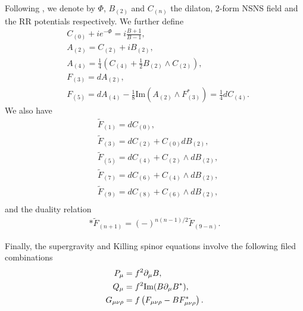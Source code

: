 Following \cite{Buchel:2000cn}, we denote by $\Phi$, $B_{(2)}$ and $C_{(n)}$ the dilaton, 2-form NSNS field and the RR potentials respectively.
We further define
\begin{align}\label{eq:defs1}
&C_{(0)} + i e^{-\Phi} = i\frac{B+1}{B-1},\nonumber\\
&A_{(2)} = C_{(2)} + i B_{(2)},\nonumber\\
&A_{(4)} = \frac{1}{4}\left(C_{(4)} + \frac{1}{2}B_{(2)}\wedge C_{(2)}\right),\nonumber\\
&F_{(3)} = d A_{(2)},\nonumber\\
&F_{(5)} = d A_{(4)} - \frac{1}{8} \text{Im} (A_{(2)}\wedge F_{(3)}^*) = \frac{1}{4} d C_{(4)}.
\end{align}
We also have
\begin{align}\label{eq:defs2}
&\tilde F_{(1)} = d C_{(0)},\nonumber\\
&\tilde F_{(3)} = d C_{(2)} + C_{(0)} d B_{(2)},\nonumber\\
&\tilde F_{(5)} = d C_{(4)} + C_{(2)} \wedge d B_{(2)},\nonumber\\
&\tilde F_{(7)} = d C_{(6)} + C_{(4)} \wedge d B_{(2)},\nonumber\\
&\tilde F_{(9)} = d C_{(8)} + C_{(6)} \wedge d B_{(2)},\nonumber\\
\end{align}
and the duality relation
\begin{align}\label{eq:dualityconstraint}
\ast \tilde F_{(n+1)} =(-)^{n(n-1)/2} \tilde F_{(9-n)}.
\end{align}

Finally, the supergravity and Killing spinor equations involve the following filed combinations
\begin{align}\label{eq:defs3}
P_\mu & = f^2 \partial_\mu B,\nonumber\\
Q_\mu & = f^2 \text{Im}(B \partial_\mu B^*),\nonumber\\
G_{\mu \nu \rho} & = f\left(F_{\mu \nu \rho} - B F_{\mu \nu \rho}^*\right).
\end{align}